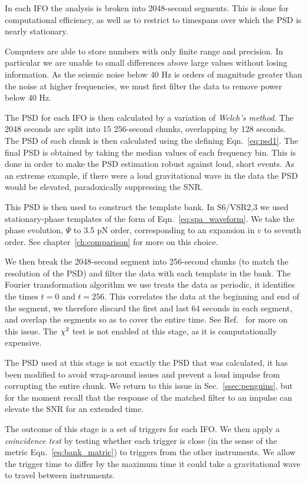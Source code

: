 In each IFO the analysis is broken into 2048-second segments.  This is
done for computational efficiency, as well as to restrict to timespans
over which the PSD is nearly stationary.  

Computers are able to store numbers with only finite range and
precision.  In particular we are unable to small differences above
large values without losing information.  As the seismic noise below
40 Hz is orders of magnitude greater than the noise at higher
frequencies, we must first filter the data to remove power below 40 Hz. 

The PSD for each IFO is then calculated by a variation of
\emph{Welch's method}.  The 2048 seconds are split into 15 256-second
chunks, overlapping by 128 seconds.  The PSD of each chunk is then
calculated using the defining Eqn.~\ref{eq:psd1}.  The final PSD
is obtained by taking the median values of each frequency bin. This is
done in order to make the PSD estimation robust against loud, short
events.  As an extreme example, if there were a loud gravitational
wave in the data the PSD would be elevated, paradoxically suppressing
the SNR. 

This PSD is then used to construct the template bank.  In S6/VSR2,3 we
used stationary-phase templates of the form of
Eqn.~\ref{eq:spa_waveform}.   We take the phase evolution, $\Psi$
to 3.5 pN order, corresponding to an expansion in $v$ to seventh
order.   See chapter~\ref{ch:comparison} for more on this choice.

We then break the 2048-second segment into 256-second chunks (to match
the resolution of the PSD) and filter the data with each template in
the bank.  The Fourier transformation algorithm we use treats the data
as periodic, it identifies the times $t=0$ and $t=256$.  This
correlates the data at the beginning and end of the segment, we
therefore discard the first and last 64 seconds in each segment, and
overlap the segments so as to cover the entire time.  See
Ref.~\cite{DBrownThesis} for more on this issue.  The $\chi^2$ test is
not enabled at this stage, as it is computationally expensive.  

The PSD used at this stage is not exactly the PSD that was calculated,
it has been modified to avoid wrap-around issues and prevent a loud
impulse from corrupting the entire chunk.  We return to this issue in
Sec.~\ref{ssec:penguins}, but for the moment recall that the
response of the matched filter to an impulse can elevate the SNR for
an extended time.

The outcome of this stage is a set of triggers for each IFO.  We then
apply a \emph{coincidence test} by testing whether each trigger is
close (in the sense of the metric Eqn.~\ref{eq:bank_matric}) to
triggers from the other instruments.  We allow the trigger time to
differ by the maximum time it could take a gravitational wave to
travel between instruments.


